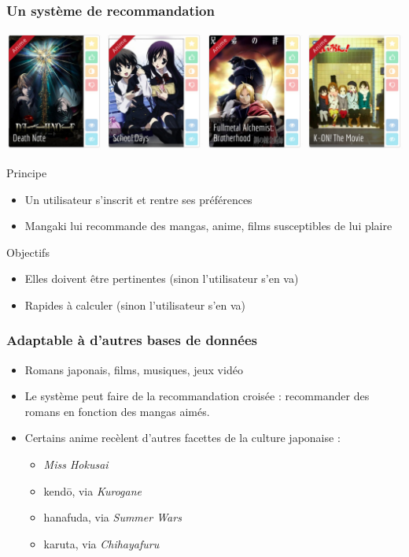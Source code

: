 \documentclass[handout]{beamer}
\begin{document}
\begin{frame}
	\frametitle{Un système de recommandation}
	\centering
	\includegraphics[width=0.9\linewidth]{figures/decks.jpg}
	\begin{block}{Principe}
	\begin{itemize}
	\item Un utilisateur s'inscrit et rentre ses préférences
	\item Mangaki lui recommande des mangas, anime, films susceptibles de lui plaire
	\end{itemize}
	\end{block}
	\pause
	\begin{block}{Objectifs}
	\begin{itemize}
	\item Elles doivent être \alert{pertinentes} (sinon l'utilisateur s'en va)
	\item \alert{Rapides} à calculer (sinon l'utilisateur s'en va)
	\end{itemize}
	\end{block}
\end{frame}

\begin{frame}
	\frametitle{Adaptable à d'autres bases de données}
	\begin{itemize}
	\item Romans japonais, films, musiques, jeux vidéo
	\item Le système peut faire de la \alert{recommandation croisée} : recommander des romans en fonction des mangas aimés.
	\item Certains anime recèlent d'autres facettes de la culture japonaise :
		\begin{itemize}
			\item \emph{Miss Hokusai}
			\item kend\=o, via \emph{Kurogane}
			\item hanafuda, via \emph{Summer Wars}
			\item karuta, via \emph{Chihayafuru}
		\end{itemize}
	\end{itemize}
\end{frame}
\end{document}
